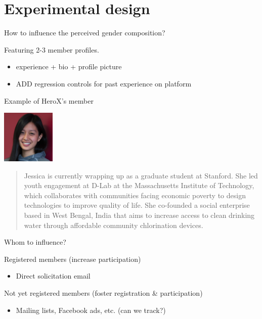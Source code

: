 \section{Experimental design}\label{experimental-design}

\begin{frame}{How to influence the perceived gender composition?}

Featuring 2-3 member profiles.

\begin{itemize}
\item
  experience + bio + profile picture
\item
  ADD regression controls for past experience on platform
\end{itemize}

\end{frame}

\begin{frame}{Example of HeroX's member}

\includegraphics[width=1.0in]{jessica.png}

\begin{quote}
Jessica is currently wrapping up as a graduate student at Stanford. She
led youth engagement at D-Lab at the Massachusetts Institute of
Technology, which collaborates with communities facing economic poverty
to design technologies to improve quality of life. She co-founded a
social enterprise based in West Bengal, India that aims to increase
access to clean drinking water through affordable community chlorination
devices.
\end{quote}

\end{frame}

\begin{frame}{Whom to influence?}

Registered members (increase participation)

\begin{itemize}
\tightlist
\item
  Direct solicitation email
\end{itemize}

Not yet registered members (foster registration \& participation)

\begin{itemize}
\tightlist
\item
  Mailing lists, Facebook ads, etc. (can we track?)
\end{itemize}

\end{frame}

